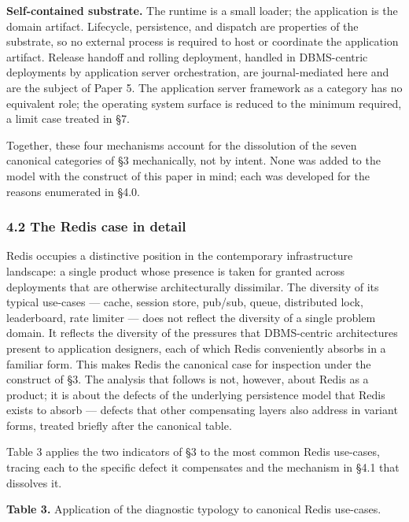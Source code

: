 \documentclass[
]{article}
\begin{document}
\textbf{Self-contained substrate.} The runtime is a small loader; the
application is the domain artifact. Lifecycle, persistence, and dispatch
are properties of the substrate, so no external process is required to
host or coordinate the application artifact. Release handoff and rolling
deployment, handled in DBMS-centric deployments by application server
orchestration, are journal-mediated here and are the subject of Paper 5.
The application server framework as a category has no equivalent role;
the operating system surface is reduced to the minimum required, a limit
case treated in §7.

Together, these four mechanisms account for the dissolution of the seven
canonical categories of §3 mechanically, not by intent. None was added
to the model with the construct of this paper in mind; each was
developed for the reasons enumerated in §4.0.

\subsubsection{4.2 The Redis case in
detail}\label{the-redis-case-in-detail}

Redis occupies a distinctive position in the contemporary infrastructure
landscape: a single product whose presence is taken for granted across
deployments that are otherwise architecturally dissimilar. The diversity
of its typical use-cases --- cache, session store, pub/sub, queue,
distributed lock, leaderboard, rate limiter --- does not reflect the
diversity of a single problem domain. It reflects the diversity of the
pressures that DBMS-centric architectures present to application
designers, each of which Redis conveniently absorbs in a familiar form.
This makes Redis the canonical case for inspection under the construct
of §3. The analysis that follows is not, however, about Redis as a
product; it is about the defects of the underlying persistence model
that Redis exists to absorb --- defects that other compensating layers
also address in variant forms, treated briefly after the canonical
table.

Table 3 applies the two indicators of §3 to the most common Redis
use-cases, tracing each to the specific defect it compensates and the
mechanism in §4.1 that dissolves it.

\textbf{Table 3.} Application of the diagnostic typology to canonical
Redis use-cases.
\end{document}
